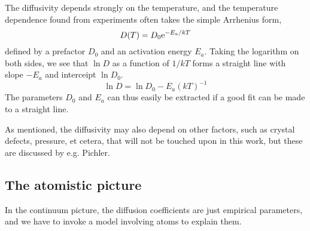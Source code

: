 \documentclass[11pt,bibliography=totoc,index=totoc]{scrbook}   %
\begin{document}
The diffusivity depends strongly on the temperature, and the temperature dependence found from experiments often takes the simple Arrhenius form,
\begin{equation}
  D(T) = D_0 \mathrm{e}^{-E_a/kT}
  \label{eq:arrhenius-dif}
\end{equation}
defined by a prefactor $D_0$ and an activation energy $E_a$. 
Taking the logarithm on both sides, we see that $\ln D$ as a function of $1/kT$ forms a straight line with slope $-E_a$ and interceipt $\ln D_0$. 
\begin{equation}
  \ln D = \ln D_0 - E_a (kT)^{-1}
\end{equation}
The parameters $D_0$ and $E_a$ can thus easily be extracted if a good fit can be made to a straight line.



As mentioned, the diffusivity may also depend on other factors, such as crystal defects, pressure, et cetera, that will not be touched upon in this work, but these are discussed by e.g. Pichler.\cite{Pichler:2004}

%
\subsection{The atomistic picture}\label{sec:AtomisticPicture}
%

In the continuum picture, the diffusion coefficients are just empirical parameters, and we have to invoke a model involving atoms to explain them.
\end{document}
